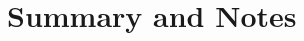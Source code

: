 \documentclass[../../book-main.tex]{subfiles}
\begin{document}


\section{Summary and Notes}
\end{document}
